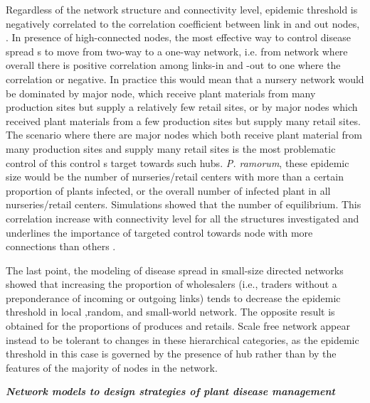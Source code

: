 Regardless of the network structure and connectivity level, epidemic threshold is negatively correlated to the correlation coefficient between link in and out nodes, . In presence of high-connected nodes, the most effective way to control disease spread s to move from two-way to a one-way network, i.e. from network where overall there is positive correlation among links-in and -out to one where the correlation or negative. In practice this would mean that a nursery network would be dominated by major node, which receive plant materials from many production sites but supply a relatively few retail sites, or by major nodes which received plant materials from a few production sites but supply many retail sites. The scenario where there are major nodes which both receive plant material from many production sites and supply many retail sites is the most problematic control of this control s target towards such hubs. \textit{P. ramorum}, these epidemic size would be the number of nurseries/retail centers with more than a certain proportion of plants infected, or the overall number of infected plant in all nurseries/retail centers. Simulations showed that the number of equilibrium. This correlation increase with connectivity level for all the structures investigated and underlines the importance of targeted control towards node with more connections than others . 

The last point, the modeling of disease spread in small-size directed networks showed that increasing the proportion of wholesalers (i.e., traders without a preponderance of incoming or outgoing links) tends to decrease the epidemic threshold in local ,random, and small-world network. The opposite result is obtained for the proportions of produces and retails. Scale free network appear instead to be tolerant to changes in these hierarchical categories, as the epidemic threshold in this case is governed by the presence of hub rather than by the features of the majority of nodes in the network.

\textit{\textbf{Network models to design strategies of plant disease management}}

